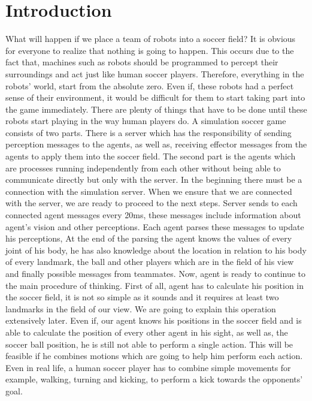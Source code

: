 \chapter{Introduction}
\label{intro}
What will happen if we place a team of robots into a soccer field? It is obvious for everyone to realize that nothing is going to happen. This occurs due to the fact that, machines such as robots should be programmed to percept their surroundings and act just like human soccer players. Therefore, everything in the robots' world, start from the absolute zero. Even if, these robots had a perfect sense of their environment, it would be difficult for them to start taking part into the game immediately. There are plenty of things that have to be done until these robots start playing in the way human players do. 
A simulation soccer game consists of two parts. There is a server which has the responsibility of sending perception messages to the agents, as well as, receiving effector messages from the agents to apply them into the soccer field. The second part is the agents which are processes running independently from each other without being able to communicate directly but only with the server.
In the beginning there must be a connection with the simulation server. When we ensure that we are connected with the server, we are ready to proceed to the next steps.
Server sends to each connected agent messages every 20ms, these messages include information about agent's vision and other perceptions. Each agent parses these messages to update his perceptions, At the end of the parsing the agent knows the values of every joint of his body,  he has also knowledge about the location in relation to his body of every landmark, the ball and other players which are in the field of his view and finally possible messages from teammates. Now, agent is ready to continue to the main procedure of thinking.
First of all, agent has to calculate his position in the soccer field, it is not so simple as it sounds and it requires at least two landmarks in the field of our view. We are going to explain this operation extensively later.
Even if, our agent knows his positions in the soccer field and is able to calculate the position of every other agent in his sight, as well as, the soccer ball position, he is still not able to perform a single action. 
This will be feasible if he combines motions which are going to help him perform each action. 
Even in real life, a human soccer player has to combine simple movements for example, walking, turning and kicking, to perform a kick towards the opponents' goal. 
